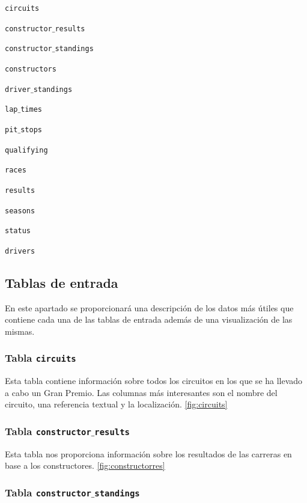 \documentclass[12pt,twoside,titlepage]{report}
\begin{document}
\begin{compactitem}
  \item \texttt{circuits}
  \item \texttt{constructor$\_$results}
  \item \texttt{constructor$\_$standings}
  \item \texttt{constructors}
  \item \texttt{driver$\_$standings}
  \item \texttt{lap$\_$times}
  \item \texttt{pit$\_$stops}
  \item \texttt{qualifying}
  \item \texttt{races}
  \item \texttt{results}
  \item \texttt{seasons}
  \item \texttt{status}
  \item \texttt{drivers}
\end{compactitem}

\subsection{Tablas de entrada}

En este apartado se proporcionará una descripción de los datos más útiles que contiene cada una de las tablas de entrada además de una visualización de las mismas.

\subsubsection{Tabla \texttt{circuits}}

Esta tabla contiene información sobre todos los circuitos en los que se ha llevado a cabo un Gran Premio. Las columnas más interesantes son el nombre del circuito, una referencia textual y la localización. \ref{fig:circuits}

\subsubsection{Tabla \texttt{constructor$\_$results}}

Esta tabla nos proporciona información sobre los resultados de las carreras en base a los constructores. \ref{fig:constructorres}


\subsubsection{Tabla \texttt{constructor$\_$standings}}
\end{document}

